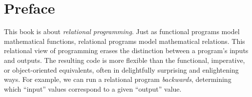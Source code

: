\chapter{Preface}\label{sec:preface}





















This book is about \emph{relational programming}.
%
Just as functional programs model mathematical functions, relational
programs model mathematical relations.
%
This relational view of programming erases the distinction between a
program's inputs and outputs.
%
The resulting code is more flexible
than the functional, imperative, or object-oriented equivalents, often
in delightfully surprising and enlightening ways.
%
For example, we can run a relational program \emph{backwards},
determining which ``input'' values correspond to a given ``output''
value.



